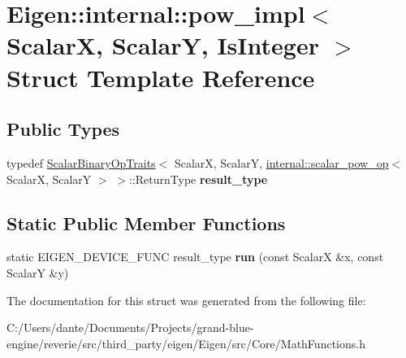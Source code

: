 \hypertarget{struct_eigen_1_1internal_1_1pow__impl}{}\section{Eigen\+::internal\+::pow\+\_\+impl$<$ ScalarX, ScalarY, Is\+Integer $>$ Struct Template Reference}
\label{struct_eigen_1_1internal_1_1pow__impl}
\subsection*{Public Types}
\begin{DoxyCompactItemize}
\item 
\mbox{\label{struct_eigen_1_1internal_1_1pow__impl_a968e422c3f9795c867ca6cfff9e164ca}} 
typedef \mbox{\hyperlink{struct_eigen_1_1_scalar_binary_op_traits}{Scalar\+Binary\+Op\+Traits}}$<$ ScalarX, ScalarY, \mbox{\hyperlink{struct_eigen_1_1internal_1_1scalar__pow__op}{internal\+::scalar\+\_\+pow\+\_\+op}}$<$ ScalarX, ScalarY $>$ $>$\+::Return\+Type {\bfseries result\+\_\+type}
\end{DoxyCompactItemize}
\subsection*{Static Public Member Functions}
\begin{DoxyCompactItemize}
\item 
\mbox{\label{struct_eigen_1_1internal_1_1pow__impl_a32a2e7c777738cc69bcf9021d35e9bc1}} 
static E\+I\+G\+E\+N\+\_\+\+D\+E\+V\+I\+C\+E\+\_\+\+F\+U\+NC result\+\_\+type {\bfseries run} (const ScalarX \&x, const ScalarY \&y)
\end{DoxyCompactItemize}


The documentation for this struct was generated from the following file\+:\begin{DoxyCompactItemize}
\item 
C\+:/\+Users/dante/\+Documents/\+Projects/grand-\/blue-\/engine/reverie/src/third\+\_\+party/eigen/\+Eigen/src/\+Core/Math\+Functions.\+h\end{DoxyCompactItemize}
